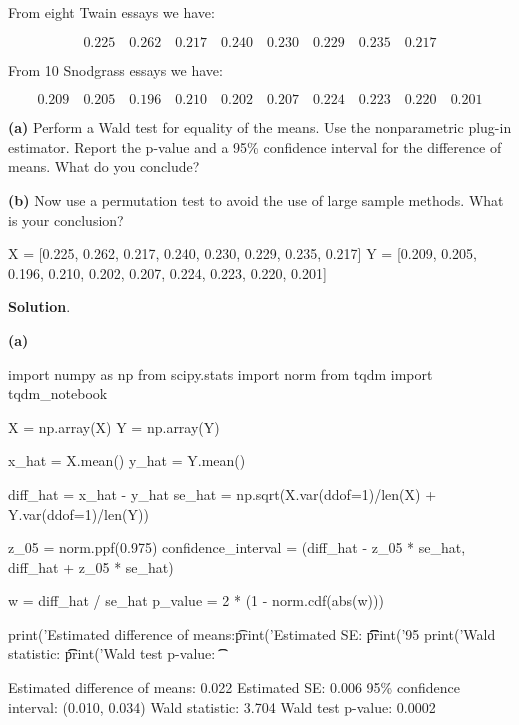 From eight Twain essays we have:

\[ 
0.225 \quad 0.262 \quad 0.217 \quad 0.240 \quad 0.230 \quad 0.229 \quad 0.235 \quad 0.217
\]

From 10 Snodgrass essays we have:

\[
0.209 \quad 0.205 \quad 0.196 \quad 0.210 \quad 0.202 \quad 0.207 \quad 0.224 \quad 0.223 \quad 0.220 \quad 0.201
\]


\textbf{(a)} Perform a Wald test for equality of the means. Use the
nonparametric plug-in estimator. Report the p-value and a 95\%
confidence interval for the difference of means. What do you conclude?

\textbf{(b)} Now use a permutation test to avoid the use of large sample
methods. What is your conclusion?

\begin{python}
X = [0.225, 0.262, 0.217, 0.240, 0.230, 0.229, 0.235, 0.217]
Y = [0.209, 0.205, 0.196, 0.210, 0.202, 0.207, 0.224, 0.223, 0.220, 0.201]
\end{python}

\textbf{Solution}.

\textbf{(a)}

\begin{python}
import numpy as np
from scipy.stats import norm
from tqdm import tqdm_notebook

X = np.array(X)
Y = np.array(Y)

x_hat = X.mean()
y_hat = Y.mean()

diff_hat = x_hat - y_hat
se_hat = np.sqrt(X.var(ddof=1)/len(X) + Y.var(ddof=1)/len(Y))

z_05 = norm.ppf(0.975)
confidence_interval = (diff_hat - z_05 * se_hat, diff_hat + z_05 * se_hat)

w = diff_hat / se_hat
p_value = 2 * (1 - norm.cdf(abs(w)))

print('Estimated difference of means:\t %
print('Estimated SE: \t\t\t %
print('95%
print('Wald statistic: \t\t %
print('Wald test p-value: \t\t %
\end{python}

\begin{console}
Estimated difference of means:   0.022
Estimated SE:                    0.006
95\% confidence interval:         (0.010, 0.034)
Wald statistic:                  3.704
Wald test p-value:               0.0002
\end{console}

